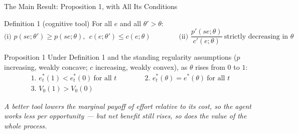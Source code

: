 \documentclass[aspectratio=169,11pt]{beamer}
\begin{document}
\begin{frame}{The Main Result: Proposition 1, with All Its Conditions}
  \small
  \begin{block}{Definition 1 (cognitive tool)}
    \vspace{-0.6em}
    For all $e$ and all $\theta'>\theta$:
    \[
      \text{(i) } p(se;\theta')\geq p(se;\theta),\ \ c(e;\theta')\leq c(e;\theta)
      \qquad\qquad
      \text{(ii) } \frac{p'(se;\theta)}{c'(e;\theta)}\ \text{strictly decreasing in }\theta
    \]
  \end{block}

  \vspace{-0.3em}
  \begin{block}{Proposition 1}
    \vspace{-0.5em}
    Under Definition 1 and the standing regularity assumptions ($p$ increasing,
    weakly concave; $c$ increasing, weakly convex), as $\theta$ rises from $0$
    to $1$:
    \[
      \begin{gathered}
        \text{1. } e_t^*(1)<e_t^*(0)\ \text{for all }t
        \qquad\qquad
        \text{2. } e_t^*(\theta)=e^*(\theta)\ \text{for all }t\\[0.3em]
        \text{3. } V_0(1)>V_0(0)
      \end{gathered}
    \]
  \end{block}

  \vspace{-0.2em}
  \centering\emph{A better tool lowers the marginal payoff of effort relative
  to its cost, so the agent works less per opportunity --- but net benefit
  still rises, so does the value of the whole process.}
\end{frame}
\end{document}
